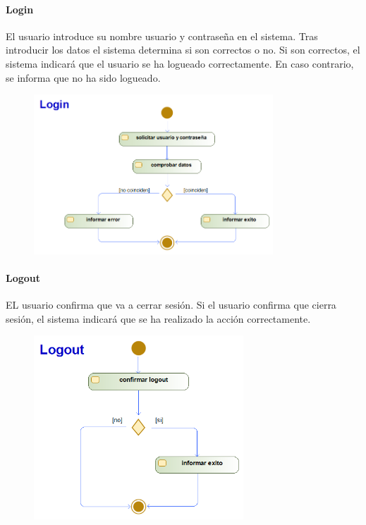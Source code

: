 \paragraph{Login}
El usuario introduce su nombre usuario y contraseña en el sistema. Tras introducir los datos el sistema determina si son correctos o no. Si son correctos, el sistema indicará que el usuario se ha logueado correctamente. En caso contrario, se informa que no ha sido logueado.
\begin{figure}[H]
    \centering
    \includegraphics[width=0.8\textwidth]{Use_Cases/login.png}
\end{figure}
\newpage
\paragraph{Logout}
EL usuario confirma que va a cerrar sesión. Si el usuario confirma que cierra sesión, el sistema indicará que se ha realizado la acción correctamente.
\begin{figure}[H]
    \centering
    \includegraphics[width=0.7\textwidth]{Use_Cases/Logout.png}
\end{figure}
\newpage
